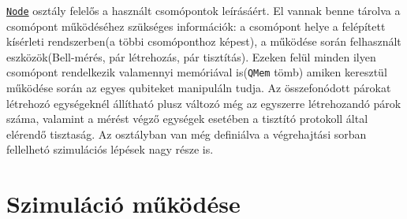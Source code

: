 \underline{\texttt{Node}} osztály felelős a használt csomópontok leírásáért. El vannak benne tárolva a csomópont működéséhez szükséges információk:  a csomópont helye a felépített kísérleti rendszerben(a többi csomóponthoz képest), a működése során felhasznált eszközök(Bell-mérés, pár létrehozás, pár tisztítás). Ezeken felül minden ilyen csomópont rendelkezik valamennyi memóriával is(\texttt{QMem} tömb) amiken keresztül működése során az egyes qubiteket manipuláln tudja. Az összefonódott párokat létrehozó egységeknél állítható plusz változó még az egyszerre létrehozandó párok száma, valamint a mérést végző egységek esetében a tisztító protokoll által elérendő tisztaság. Az osztályban van még definiálva a végrehajtási sorban fellelhetó szimulációs lépések nagy része is.

\section{Szimuláció működése}

